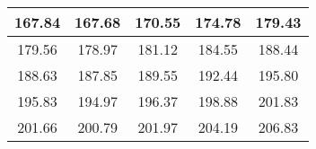\begin{large}\begin{tabular}{|c|c|c|c|c|}
\hline
167.84&167.68&170.55&174.78&179.43\\\hline
179.56&178.97&181.12&184.55&188.44\\\hline
188.63&187.85&189.55&192.44&195.80\\\hline
195.83&194.97&196.37&198.88&201.83\\\hline
201.66&200.79&201.97&204.19&206.83\\\hline
\end{tabular}
\end{large}